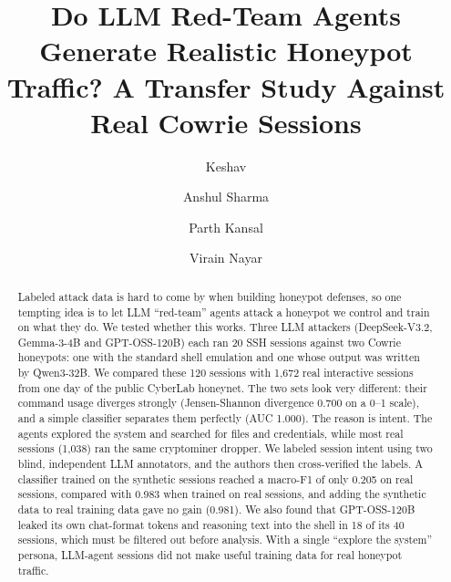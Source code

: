 \documentclass[runningheads]{llncs}
\begin{document}
\title{Do LLM Red-Team Agents Generate Realistic Honeypot Traffic? A Transfer Study Against Real Cowrie Sessions}

\author{Keshav \and Anshul Sharma \and Parth Kansal \and Virain Nayar}


\maketitle

\begin{abstract}
Labeled attack data is hard to come by when building honeypot defenses, so one tempting idea is to let LLM ``red-team'' agents attack a honeypot we control and train on what they do. We tested whether this works. Three LLM attackers (DeepSeek-V3.2, Gemma-3-4B and GPT-OSS-120B) each ran 20 SSH sessions against two Cowrie honeypots: one with the standard shell emulation and one whose output was written by Qwen3-32B. We compared these 120 sessions with 1,672 real interactive sessions from one day of the public CyberLab honeynet. The two sets look very different: their command usage diverges strongly (Jensen-Shannon divergence 0.700 on a 0--1 scale), and a simple classifier separates them perfectly (AUC 1.000). The reason is intent. The agents explored the system and searched for files and credentials, while most real sessions (1,038) ran the same cryptominer dropper. We labeled session intent using two blind, independent LLM annotators, and the authors then cross-verified the labels. A classifier trained on the synthetic sessions reached a macro-F1 of only 0.205 on real sessions, compared with 0.983 when trained on real sessions, and adding the synthetic data to real training data gave no gain (0.981). We also found that GPT-OSS-120B leaked its own chat-format tokens and reasoning text into the shell in 18 of its 40 sessions, which must be filtered out before analysis. With a single ``explore the system'' persona, LLM-agent sessions did not make useful training data for real honeypot traffic.

\end{abstract}
\end{document}
